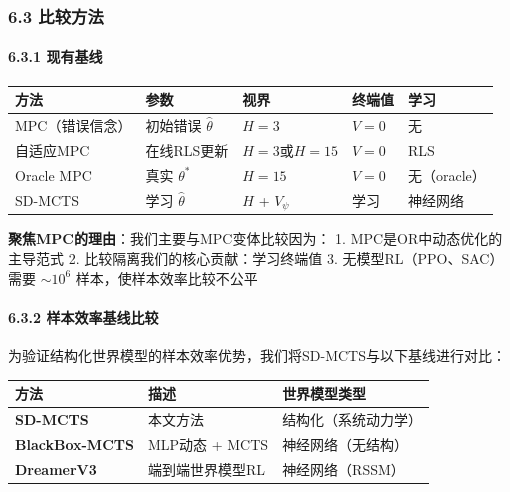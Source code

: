\documentclass[UTF8]{ctexart}
\let\oldparagraph\paragraph
\renewcommand{\paragraph}[1]{\oldparagraph{#1}\mbox{}}
\begin{document}
\hypertarget{ux6bd4ux8f83ux65b9ux6cd5}{%
\subsubsection{6.3 比较方法}\label{ux6bd4ux8f83ux65b9ux6cd5}}

\hypertarget{ux73b0ux6709ux57faux7ebf}{%
\paragraph{6.3.1 现有基线}\label{ux73b0ux6709ux57faux7ebf}}

\begin{table}[h]
\centering
\begin{tabular}{p{4cm}p{2.5cm}p{2.5cm}p{2.5cm}p{2.5cm}}
\toprule
\textbf{方法} & \textbf{参数} & \textbf{视界} & \textbf{终端值} & \textbf{学习} \\
\midrule
MPC（错误信念） & 初始错误 \(\hat{\theta}\) & \(H=3\) & \(V=0\) & 无 \\
自适应MPC & 在线RLS更新 & \(H=3\)或\(H=15\) & \(V=0\) & RLS \\
Oracle MPC & 真实 \(\theta^*\) & \(H=15\) & \(V=0\) & 无（oracle） \\
SD-MCTS & 学习 \(\hat{\theta}\) & \(H\) + \(V_\psi\) & 学习 & 神经网络 \\
\bottomrule
\end{tabular}
\end{table}

\textbf{聚焦MPC的理由}：我们主要与MPC变体比较因为： 1.
MPC是OR中动态优化的主导范式 2. 比较隔离我们的核心贡献：学习终端值 3.
无模型RL（PPO、SAC）需要 \(\sim 10^6\) 样本，使样本效率比较不公平

\hypertarget{ux6837ux672cux6548ux7387ux57faux7ebfux6bd4ux8f83}{%
\paragraph{6.3.2
样本效率基线比较}\label{ux6837ux672cux6548ux7387ux57faux7ebfux6bd4ux8f83}}

为验证结构化世界模型的样本效率优势，我们将SD-MCTS与以下基线进行对比：

\begin{table}[h]
\centering
\begin{tabular}{p{3cm}p{5cm}p{6cm}}
\toprule
\textbf{方法} & \textbf{描述} & \textbf{世界模型类型} \\
\midrule
\textbf{SD-MCTS} & 本文方法 & 结构化（系统动力学） \\
\textbf{BlackBox-MCTS} & MLP动态 + MCTS & 神经网络（无结构） \\
\textbf{DreamerV3} & 端到端世界模型RL & 神经网络（RSSM） \\
\bottomrule
\end{tabular}
\end{table}
\end{document}
